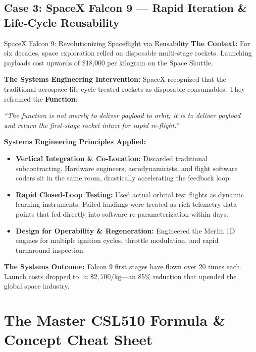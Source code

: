 \subsection{Case 3: SpaceX Falcon 9 --- Rapid Iteration \& Life-Cycle Reusability}
\begin{storybox}{SpaceX Falcon 9: Revolutionizing Spaceflight via Reusability}
\textbf{The Context:} For six decades, space exploration relied on disposable multi-stage rockets. Launching payloads cost upwards of \$18,000 per kilogram on the Space Shuttle.

\textbf{The Systems Engineering Intervention:}
SpaceX recognized that the traditional aerospace life cycle treated rockets as disposable consumables. They reframed the \textbf{Function}:
\begin{center}
\textit{``The function is not merely to deliver payload to orbit; it is to deliver payload and return the first-stage rocket intact for rapid re-flight.''}
\end{center}
\textbf{Systems Engineering Principles Applied:}
\begin{itemize}[leftmargin=1.5em]
    \item \textbf{Vertical Integration \& Co-Location:} Discarded traditional subcontracting. Hardware engineers, aerodynamicists, and flight software coders sit in the same room, drastically accelerating the feedback loop.
    \item \textbf{Rapid Closed-Loop Testing:} Used actual orbital test flights as dynamic learning instruments. Failed landings were treated as rich telemetry data points that fed directly into software re-parameterization within days.
    \item \textbf{Design for Operability \& Regeneration:} Engineered the Merlin 1D engines for multiple ignition cycles, throttle modulation, and rapid turnaround inspection.
\end{itemize}
\textbf{The Systems Outcome:} Falcon 9 first stages have flown over 20 times each. Launch costs dropped to $\approx \$2,700/\text{kg}$—an 85\% reduction that upended the global space industry.
\end{storybox}

\section{The Master CSL510 Formula \& Concept Cheat Sheet}
\label{sec:master_cheat_sheet}

